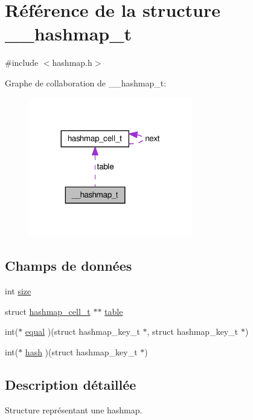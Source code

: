 \hypertarget{struct____hashmap__t}{\section{Référence de la structure \+\_\+\+\_\+hashmap\+\_\+t}
\label{struct____hashmap__t}
}


{\ttfamily \#include $<$hashmap.\+h$>$}



Graphe de collaboration de \+\_\+\+\_\+hashmap\+\_\+t\+:\nopagebreak
\begin{figure}[H]
\begin{center}
\leavevmode
\includegraphics[width=203pt]{struct____hashmap__t__coll__graph}
\end{center}
\end{figure}
\subsection*{Champs de données}
\begin{DoxyCompactItemize}
\item 
int \hyperlink{struct____hashmap__t_ab5f1e74c3fcf71ee4ac91a860cbcde19}{size}
\item 
struct \hyperlink{structhashmap__cell__t}{hashmap\+\_\+cell\+\_\+t} $\ast$$\ast$ \hyperlink{struct____hashmap__t_ac7d3b722978b8bafab2ce2a923b747aa}{table}
\item 
int($\ast$ \hyperlink{struct____hashmap__t_a2b730301a68342f67a406ce1b6c2a826}{equal} )(struct hashmap\+\_\+key\+\_\+t $\ast$, struct hashmap\+\_\+key\+\_\+t $\ast$)
\item 
int($\ast$ \hyperlink{struct____hashmap__t_aa56e33c3baa182a530a4a8bfc27c11f1}{hash} )(struct hashmap\+\_\+key\+\_\+t $\ast$)
\end{DoxyCompactItemize}


\subsection{Description détaillée}
Structure représentant une hashmap. 

